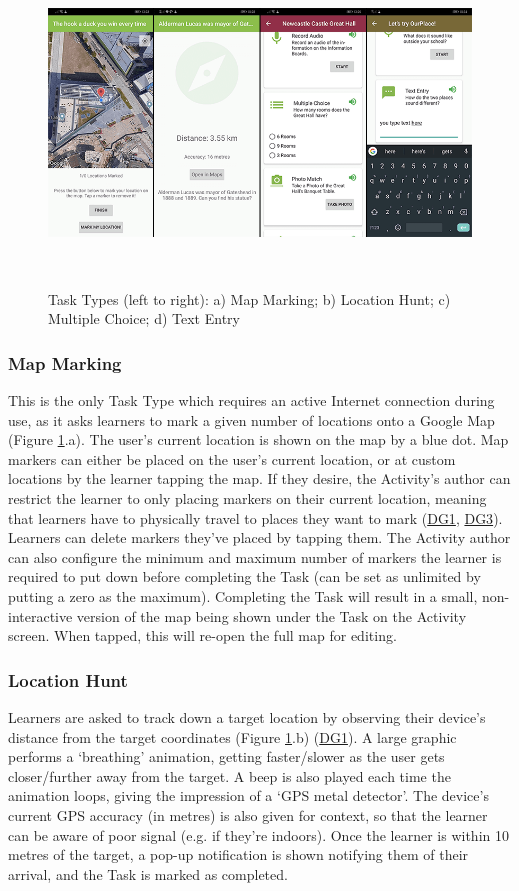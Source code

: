 \begin{figure}
  \centering
  \includegraphics[width=1\columnwidth]{images/chapter05/tasktypes3.png}
  \caption[Task Types (part 3)]{Task Types (left to right): a) Map Marking; b) Location Hunt; c) Multiple Choice; d) Text Entry}~\label{fig:TaskTypes3}
\end{figure}

\subsubsection*{Map Marking}
This is the only Task Type which requires an active Internet connection during use, as it asks learners to mark a given number of locations onto a Google Map (Figure \ref{fig:TaskTypes3}.a). The user's current location is shown on the map by a blue dot. Map markers can either be placed on the user's current location, or at custom locations by the learner tapping the map. If they desire, the Activity's author can restrict the learner to only placing markers on their current location, meaning that learners have to physically travel to places they want to mark (\hyperref[DG1]{DG1}, \hyperref[DG3]{DG3}). Learners can delete markers they've placed by tapping them. The Activity author can also configure the minimum and maximum number of markers the learner is required to put down before completing the Task (can be set as unlimited by putting a zero as the maximum). Completing the Task will result in a small, non-interactive version of the map being shown under the Task on the Activity screen. When tapped, this will re-open the full map for editing.

\subsubsection*{Location Hunt}
Learners are asked to track down a target location by observing their device's distance from the target coordinates (Figure \ref{fig:TaskTypes3}.b) (\hyperref[DG1]{DG1}). A large graphic performs a `breathing' animation, getting faster/slower as the user gets closer/further away from the target. A beep is also played each time the animation loops, giving the impression of a `GPS metal detector'. The device's current GPS accuracy (in metres) is also given for context, so that the learner can be aware of poor signal (e.g. if they're indoors). Once the learner is within 10 metres of the target, a pop-up notification is shown notifying them of their arrival, and the Task is marked as completed. 

